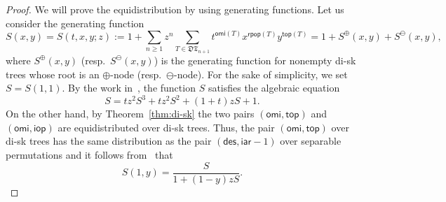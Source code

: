 \documentclass[12pt]{amsart}
\numberwithin{equation}{section}
\theoremstyle{plain}
\theoremstyle{definition}
\def\des{\mathsf{des}}
\def\iar{\mathsf{iar}}
\newcommand{\DT}{\mathfrak{DT}}
\def\iop{\mathsf{iop}}
\def\top{\mathsf{top}}
\def\rpop{\mathsf{rpop}}
\def\omi{\mathsf{omi}}
\begin{document}
\begin{proof}
We will prove the equidistribution by using generating functions.
Let us consider the generating function
$$
S(x,y)=S(t,x,y;z):=1+\sum_{n\ge 1}z^n\sum_{T\in\DT_{n+1}}t^{\omi(T)}x^{\rpop(T)}y^{\top(T)}=1+S^{\oplus}(x,y)+S^{\ominus}(x,y),
$$
where $S^{\oplus}(x,y)$ (resp.~$S^{\ominus}(x,y)$) is the generating function for nonempty di-sk trees whose root is an $\oplus$-node (resp.~$\ominus$-node). For the sake of simplicity, we set $S=S(1,1)$. By the work in~\cite{flz}, the function $S$ satisfies the algebraic equation
\begin{equation}\label{S:des}
S=tz^2S^3+tz^2S^2+(1+t)zS+1.
\end{equation}
On the other hand, by Theorem~\ref{thm:di-sk} the two pairs $(\omi,\top)$ and $(\omi,\iop)$ are equidistributed over di-sk trees. Thus, the pair $(\omi,\top)$ over di-sk trees has the same distribution as the pair $(\des,\iar-1)$ over separable permutations and it follows from~\cite[Eq.~(5.4)]{flw} that 
\begin{equation}\label{S:top}
S(1,y)=\frac{S}{1+(1-y)zS}.
\end{equation}



\end{proof}
\end{document}
